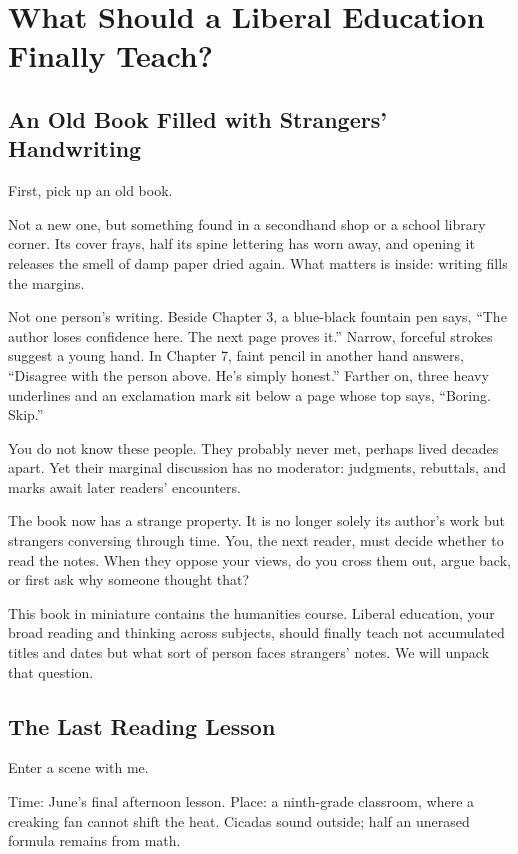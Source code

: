\chapter[What Should Liberal Education Do?]{What Should a Liberal Education Finally Teach?}
\section{An Old Book Filled with Strangers' Handwriting}
First, pick up an old book.

Not a new one, but something found in a secondhand shop or a school library corner. Its cover frays, half its spine lettering has worn away, and opening it releases the smell of damp paper dried again. What matters is inside: writing fills the margins.

Not one person's writing. Beside Chapter 3, a blue-black fountain pen says, ``The author loses confidence here. The next page proves it.'' Narrow, forceful strokes suggest a young hand. In Chapter 7, faint pencil in another hand answers, ``Disagree with the person above. He's simply honest.'' Farther on, three heavy underlines and an exclamation mark sit below a page whose top says, ``Boring. Skip.''

You do not know these people. They probably never met, perhaps lived decades apart. Yet their marginal discussion has no moderator: judgments, rebuttals, and marks await later readers' encounters.

The book now has a strange property. It is no longer solely its author's work but strangers conversing through time. You, the next reader, must decide whether to read the notes. When they oppose your views, do you cross them out, argue back, or first ask why someone thought that?

This book in miniature contains the humanities course. Liberal education, your broad reading and thinking across subjects, should finally teach not accumulated titles and dates but what sort of person faces strangers' notes. We will unpack that question.

\section{The Last Reading Lesson}
Enter a scene with me.

Time: June's final afternoon lesson. Place: a ninth-grade classroom, where a creaking fan cannot shift the heat. Cicadas sound outside; half an unerased formula remains from math.

